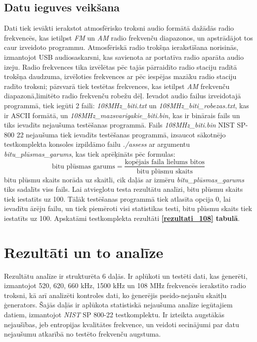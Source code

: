 \documentclass[12pt]{article}
\begin{document}
    \subsection{Datu ieguves veikšana}
    
    Dati tiek ievākti ierakstot atmosfērisko troksni audio formātā dažādās radio frekvencēs, kas ietilpst \emph{FM} un \emph{AM} radio frekvenču diapazonos, un apstrādājot tos caur izveidoto programmu. Atmosfēriskā radio trokšņa ierakstīšana norisinās, izmantojot USB audiosaskarsni, kas savienota ar portatīva radio aparāta audio izeju. Radio frekvences tika izvēlētas pēc tajās pārraidīto radio staciju radītā trokšņa daudzuma, izvēloties frekvences ar pēc iespējas mazāku radio staciju radīto troksni; pārsvarā tiek testētas frekvences, kas ietilpst \emph{AM} frekvenču diapazonā,limitēto radio frekvenču robežu dēļ. Ievadot audio failus izveidotajā programmā, tiek iegūti 2 faili:
    \emph{108MHz\_biti.txt} un 
    \emph{108MHz\_biti\_robezas.txt}, kas ir ASCII formātā, un \emph{108MHz\_mazsvarigakie\_biti.bin}, kas ir binārais fails un tiks ievadīts
    nejaušuma testēšanas programmā. Fails \emph{108MHz\_biti.bin} NIST SP-800 22 nejaušuma tiek ievadīts testēšanas programmā,
    izsaucot sākotnējo testkomplekta konsoles izpildāmo failu \emph{./assess} ar argumentu \emph{bitu\_plūsmas\_garums}, kas tiek aprēķināts pēc formulas:
    \[
    \text{bitu plūsmas garums} = \frac{\text{kopējais faila lielums bitos}}{\text{bitu plūsmu skaits}}
    \]
    bitu plūsmu skaits norāda uz skaitli, cik daļās ar izmēru \emph{bitu\_plūsmas\_garums} tiks sadalīts viss fails. Lai atvieglotu testa rezultātu analīzi, bitu plūsmu skaits tiek iestatīts uz 100. 
    Tālāk testēšanas programmā tiek atlasīta opcija 0, lai ievadītu ārēju failu, un tiek piemēroti visi statistikas testi, bitu plūsmu skaits tiek iestatīts uz 100. Apskatāmi testkomplekta rezultāti \textbf{\ref{rezultati_108} tabulā}.
    \section{Rezultāti un to analīze}
    Rezultātu analīze ir strukturēta 6 daļās. Ir aplūkoti un testēti dati, kas ģenerēti, izmantojot 520, 620, 660 kHz, 1500 kHz un 108 MHz frekvencēs ierakstīto radio troksni, kā arī analizēti kontroles dati, ko ģenerējis pseido-nejaušu skaitļu ģenerators. Šajās daļās ir aplūkota statistiskā nejaušuma analīze iegūtajiem datiem, izmantojot \emph{NIST} SP 800-22 testkomplektu. Ir izteikta augstākās nejaušības, jeb entropijas kvalitātes frekvence, un veidoti secinājumi par datu nejaušumu atkarībā no testēto frekvenču augstuma. 
    
\end{document}
